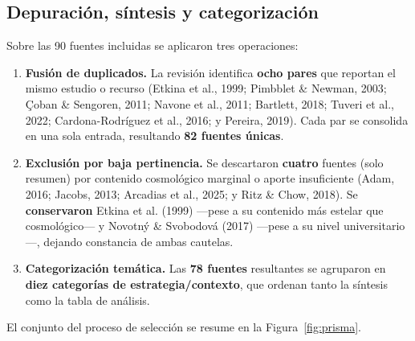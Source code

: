 \subsection{Depuración, síntesis y categorización}

Sobre las 90 fuentes incluidas se aplicaron tres operaciones:

\begin{enumerate}
\item \textbf{Fusión de duplicados.} La revisión identifica \textbf{ocho pares} que reportan el mismo estudio o recurso (Etkina et al., 1999; Pimbblet \& Newman, 2003; Çoban \& Sengoren, 2011; Navone et al., 2011; Bartlett, 2018; Tuveri et al., 2022; Cardona-Rodríguez et al., 2016; y Pereira, 2019). Cada par se consolida en una sola entrada, resultando \textbf{82 fuentes únicas}.
\item \textbf{Exclusión por baja pertinencia.} Se descartaron \textbf{cuatro} fuentes (solo resumen) por contenido cosmológico marginal o aporte insuficiente (Adam, 2016; Jacobs, 2013; Arcadias et al., 2025; y Ritz \& Chow, 2018). Se \textbf{conservaron} Etkina et al. (1999) ---pese a su contenido más estelar que cosmológico--- y Novotný \& Svobodová (2017) ---pese a su nivel universitario---, dejando constancia de ambas cautelas.
\item \textbf{Categorización temática.} Las \textbf{78 fuentes} resultantes se agruparon en \textbf{diez categorías de estrategia/contexto}, que ordenan tanto la síntesis como la tabla de análisis.
\end{enumerate}

El conjunto del proceso de selección se resume en la Figura~\ref{fig:prisma}.

